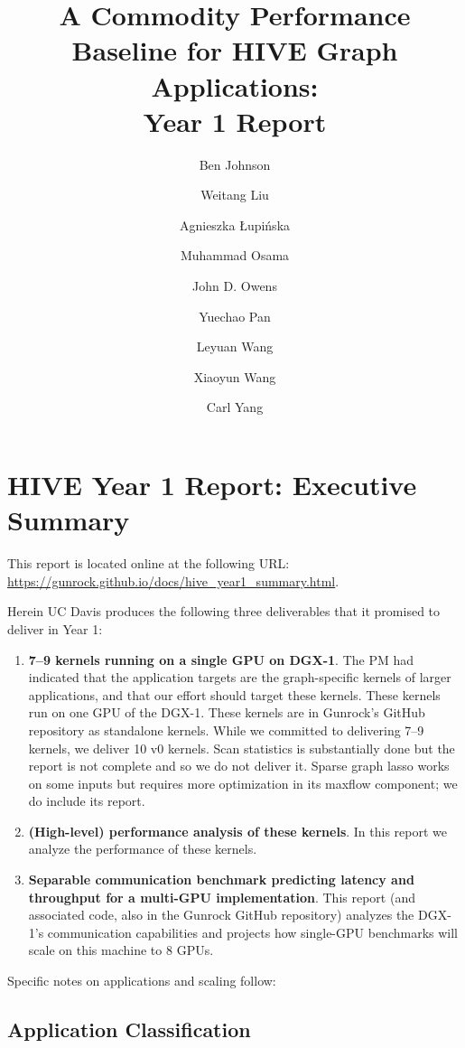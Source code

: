 \documentclass[10pt,oneside]{memoir}
\title{A Commodity Performance Baseline for HIVE Graph Applications:\\Year 1 Report}
\author{Ben Johnson \and Weitang Liu \and Agnieszka Łupińska \and Muhammad Osama \and John D. Owens \and Yuechao Pan \and Leyuan Wang \and Xiaoyun Wang \and Carl Yang}
\date{}
\providecommand{\tightlist}{%
  \setlength{\itemsep}{0pt}\setlength{\parskip}{0pt}}
\begin{document}
\maketitle

{
\hypersetup{linkcolor=black}
\setcounter{tocdepth}{0}
\tableofcontents*
}
\hypertarget{hive-year-1-report-executive-summary}{%
\chapter{HIVE Year 1 Report: Executive
Summary}\label{hive-year-1-report-executive-summary}}

This report is located online at the following URL:
\url{https://gunrock.github.io/docs/hive_year1_summary.html}.

Herein UC Davis produces the following three deliverables that it
promised to deliver in Year 1:

\begin{enumerate}
\def\labelenumi{\arabic{enumi}.}
\tightlist
\item
  \textbf{7--9 kernels running on a single GPU on DGX-1}. The PM had
  indicated that the application targets are the graph-specific kernels
  of larger applications, and that our effort should target these
  kernels. These kernels run on one GPU of the DGX-1. These kernels are
  in Gunrock's GitHub repository as standalone kernels. While we
  committed to delivering 7--9 kernels, we deliver 10 v0 kernels. Scan
  statistics is substantially done but the report is not complete and so
  we do not deliver it. Sparse graph lasso works on some inputs but
  requires more optimization in its maxflow component; we do include its
  report.
\item
  \textbf{(High-level) performance analysis of these kernels}. In this
  report we analyze the performance of these kernels.
\item
  \textbf{Separable communication benchmark predicting latency and
  throughput for a multi-GPU implementation}. This report (and
  associated code, also in the Gunrock GitHub repository) analyzes the
  DGX-1's communication capabilities and projects how single-GPU
  benchmarks will scale on this machine to 8 GPUs.
\end{enumerate}

Specific notes on applications and scaling follow:

\hypertarget{application-classification}{%
\section{Application Classification}\label{application-classification}}
\end{document}

